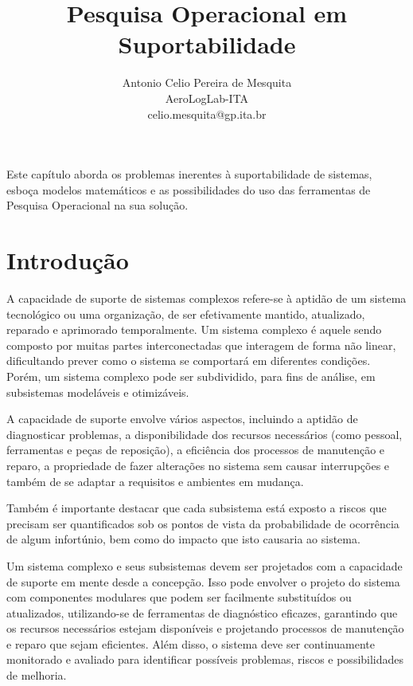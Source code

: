\documentclass{abntex2}
\begin{document}
		
	\title{Pesquisa Operacional em Suportabilidade}
	\author{Antonio Celio Pereira de Mesquita\\ AeroLogLab-ITA\\  \small{celio.mesquita@gp.ita.br} }
	\date{} %

\maketitle

\begin{sloppypar}

	Este capítulo aborda os problemas inerentes à suportabilidade de sistemas, esboça modelos matemáticos e as possibilidades do uso das ferramentas de Pesquisa Operacional na sua solução.
	

\section{Introdução}

A capacidade de suporte de sistemas complexos refere-se à aptidão de um sistema tecnológico ou uma organização, de ser efetivamente mantido, atualizado, reparado e aprimorado temporalmente. Um sistema complexo é aquele sendo composto por muitas partes interconectadas que interagem de forma não linear, dificultando prever como o sistema se comportará em diferentes condições. Porém, um sistema complexo pode ser subdividido, para fins de análise, em subsistemas modeláveis e otimizáveis.

A capacidade de suporte envolve vários aspectos, incluindo a aptidão de diagnosticar problemas, a disponibilidade dos recursos necessários (como pessoal, ferramentas e peças de reposição), a eficiência dos processos de manutenção e reparo, a propriedade de fazer alterações no sistema sem causar interrupções e também de se adaptar a requisitos e ambientes em mudança.

Também é importante destacar que cada subsistema está exposto a riscos que precisam ser quantificados sob os pontos de vista da probabilidade de ocorrência de algum infortúnio, bem como do impacto que isto causaria ao sistema.

Um sistema complexo e seus subsistemas devem ser projetados com a capacidade de suporte em mente desde a concepção. Isso pode envolver o projeto do sistema com componentes modulares que podem ser facilmente substituídos ou atualizados, utilizando-se de ferramentas de diagnóstico eficazes, garantindo que os recursos necessários estejam disponíveis e projetando processos de manutenção e reparo que sejam eficientes. Além disso, o sistema deve ser continuamente monitorado e avaliado para identificar possíveis problemas, riscos e possibilidades de melhoria.


\end{sloppypar}
\end{document}
